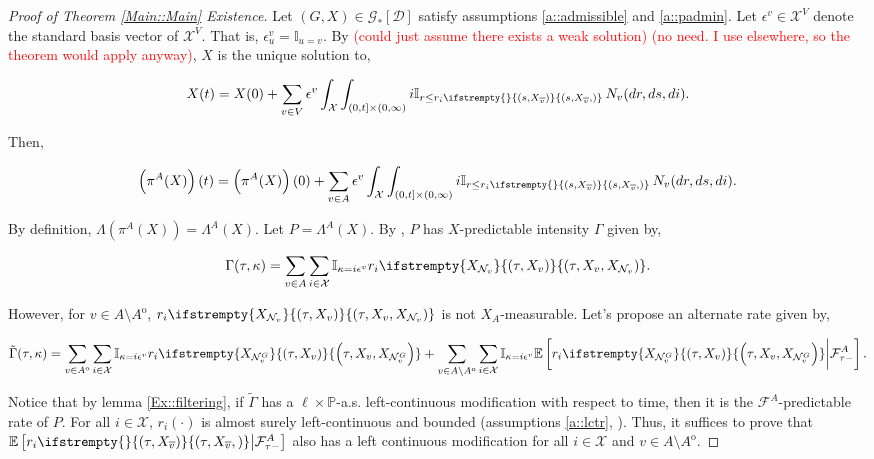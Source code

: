 \documentclass[12pt]{article}
\newcommand{\mb}{\mathbb}
\newcommand{\mc}{\mathcal}
\newcommand{\ov}{\overline}
\newcommand{\ep}{\epsilon}
\newcommand{\tr}{\textcolor{red}}
\newcommand{\pr}{\mb{P}}							%
\newcommand{\ex}[1]{\mb{E}\left[#1\right]}			%
\newcommand{\cad}{\mc{D}}							%
\newcommand{\sta}{\mc{X}}							%
\newcommand{\neigh}[1]{\mc{N}_{#1}}				%
\newcommand{\gneigh}[2]{\mc{N}^{#1}_{#2}}			%
\newcommand{\cl}[1]{\ov{#1}}						%
\newcommand{\Xf}{X}									%
\newcommand{\poiss}{N}								%
\newcommand{\Sm}{\ell}								%
\newcommand{\rate}{r}								%
\newcommand{\F}{\mc{F}}								%
\newcommand{\proj}{\pi}								%
\newcommand{\poissv}[1]{_{#1}}						%
\newcommand{\vind}[1]{_{#1}}						%
\newcommand{\tme}[1]{(#1)}							%
\newcommand{\vpara}[1]{^{#1}}						%
\newcommand{\stpara}[1]{_{#1}}						%
\newcommand{\tpara}[1]{_{#1}}						%
\newcommand{\Gs}{\mc{G}_\ast}						%
\newcommand{\tmepro}[3]{
\ifstrempty{#3}{
	\left(#1,#2\right)}{
	\left(#1,#2,#3\right)}}							%
\renewcommand{\sp}[1]{[#1]}							%
\newcommand{\inte}[1]{{#1}^\mathrm{o}}				%
\newcommand{\alt}[1]{\tilde{#1}}					%
\newcommand{\pmap}{\Lambda}							%
\newcommand{\rt}{\tau}								%
\renewcommand{\mark}{\kappa}						%
\newcommand{\ratee}{\Gamma}							%
\newcommand{\cratee}{\alt{\ratee}}					%
\newcommand{\rp}{P}									%
\newcommand{\ev}[1]{\ep^{#1}}						%
\begin{document}
\begin{proof}[Proof of Theorem \ref{Main::Main} Existence]

Let \((G,\Xf) \in \Gs\sp{\cad}\) satisfy assumptions \ref{a::admissible} and \ref{a::padmin}. Let \(\ev{v} \in \sta^V\) denote the standard basis vector of \(\sta^V\). That is, \(\ev{v}\vind{u} = \mb{I}_{u=v}\). By \cite[theorem \ref{F-wp::wp}]{F} \tr{(could just assume there exists a weak solution) (no need. I use \cite[assumptions \ref{F-a::bddinit} and \ref{F-a::bddr}]{F} elsewhere, so the theorem would apply anyway)}, \(\Xf\) is the unique solution to,

\[\Xf\tme{t} = \Xf\tme{0} + \sum_{v \in V}\ev{v}\int_\sta\int_{(0,t]\times (0,\infty)} i\mb{I}_{r \leq \rate\stpara{i}\tmepro{s}{\Xf\vind{\cl{v}}}{}}\,\poiss\poissv{v}(dr,ds,di).\]

Then,

\[\left(\proj\vpara{A}(\Xf)\right)\tme{t} = \left(\proj\vpara{A}(\Xf)\right)\tme{0} + \sum_{v\in A}\ev{v}\int_\sta\int_{(0,t]\times (0,\infty)} i\mb{I}_{r \leq \rate\stpara{i}\tmepro{s}{\Xf\vind{\cl{v}}}{}}\,\poiss\poissv{v}(dr,ds,di).\]

By definition, \(\pmap\left(\proj\vpara{A}(\Xf)\right) = \pmap\vpara{A}(\Xf)\). Let \(\rp = \pmap\vpara{A}(\Xf)\). By \cite[Exercise 14.7.1]{DalVer08}, \(\rp\) has \(\Xf\)-predictable intensity \(\ratee\) given by,

\[\ratee(\rt,\mark) = \sum_{v \in A} \sum_{i \in \sta} \mb{I}_{\mark = i\ev{v}} \rate\stpara{i}\tmepro{\rt}{\Xf\vind{v}}{\Xf\vind{\neigh{v}}}.\]

However, for \(v \in A\setminus \inte{A}\), \(\rate\stpara{i}\tmepro{\rt}{\Xf\vind{v}}{\Xf\vind{\neigh{v}}}\) is not \(\Xf\vind{A}\)-measurable. Let's propose an alternate rate given by,

\begin{equation}
\cratee(\rt,\mark) = \sum_{v \in \inte{A}}\sum_{i\in \sta} \mb{I}_{\mark = i\ev{v}}\rate\stpara{i}\tmepro{\rt}{\Xf\vind{v}}{\Xf\vind{\gneigh{G}{v}}} + \sum_{v \in A\setminus \inte{A}}\sum_{i \in \sta} \mb{I}_{\mark = i\ev{v}}\ex{\rate\stpara{i}\tmepro{\rt}{\Xf\vind{v}}{\Xf\vind{\gneigh{G}{v}}}\middle|\F\vpara{A}\tpara{\rt-}}.
\label{Ex::tempfiltrate}
\end{equation}

Notice that by lemma \ref{Ex::filtering}, if \(\alt{\ratee}\) has a \(\Sm\times \pr\)-a.s. left-continuous modification with respect to time, then it is the \(\F\vpara{A}\)-predictable rate of \(\rp\). For all \(i\in\sta\), \(\rate\stpara{i}\tme{\cdot}\) is almost surely left-continuous and bounded (assumptions \ref{a::lctr}, \cite[\ref{F-a::bddr}]{F}). Thus, it suffices to prove that \(\ex{\rate\stpara{i}\tmepro{\rt}{\Xf\vind{\cl{v}}}{}\middle|\F\vpara{A}\tpara{\rt-}}\) also has a left continuous modification for all \(i\in \sta\) and \(v \in A\setminus\inte{A}\).


\end{proof}
\end{document}
